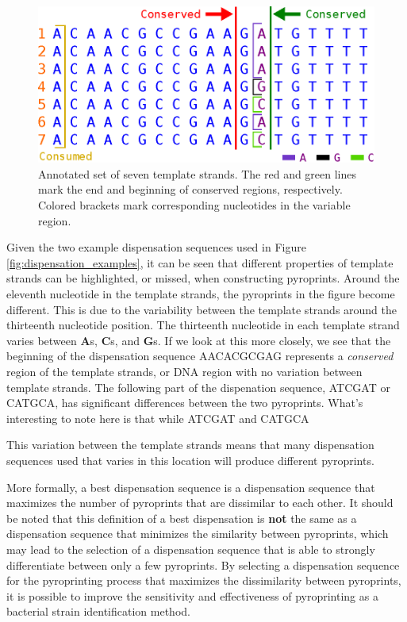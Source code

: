 \documentclass[12pt]{ucthesis}
\begin{document}
      \begin{figure}[t]
         \centering
         \includegraphics[width=0.7\columnwidth]{graphics/TemplateStrandAdvancement.eps}
         \caption{Annotated set of seven template strands. The red and green
                  lines mark the end and beginning of conserved regions,
                  respectively. Colored brackets mark corresponding nucleotides
                  in the variable region.}
         \label{fig:annotated_templates}
      \end{figure}

      Given the two example dispensation sequences used in Figure
      \ref{fig:dispensation_examples}, it can be seen that different properties of
      template strands can be highlighted, or missed, when constructing
      pyroprints. Around the eleventh nucleotide in the template strands, the
      pyroprints in the figure become different. This is due to the variability
      between the template strands around the thirteenth nucleotide position. The
      thirteenth nucleotide in each template strand varies between
      \textbf{A}s, \textbf{C}s, and \textbf{G}s. If we look at this more closely,
      we see that the beginning of the dispensation sequence AACACGCGAG represents
      a \textit{conserved} region of the template strands, or DNA region with no
      variation between template strands. The following part of the dispenation
      sequence, ATCGAT or CATGCA, has significant differences between the two
      pyroprints. What's interesting to note here is that while ATCGAT and CATGCA
      
      This variation between the
      template strands means that many dispensation sequences used that varies in
      this location will produce different pyroprints.

   
      More formally, a best dispensation sequence is a dispensation
      sequence that maximizes the number of pyroprints that are dissimilar to each
      other. It should be noted that this definition of a best dispensation is
      \textbf{not} the same as a dispensation sequence that minimizes the
      similarity between pyroprints, which may lead to the selection of a
      dispensation sequence that is able to strongly differentiate between only a
      few pyroprints. By selecting a dispensation sequence for the pyroprinting
      process that maximizes the dissimilarity between pyroprints, it is possible
      to improve the sensitivity and effectiveness of pyroprinting as a bacterial
      strain identification method.
\end{document}
